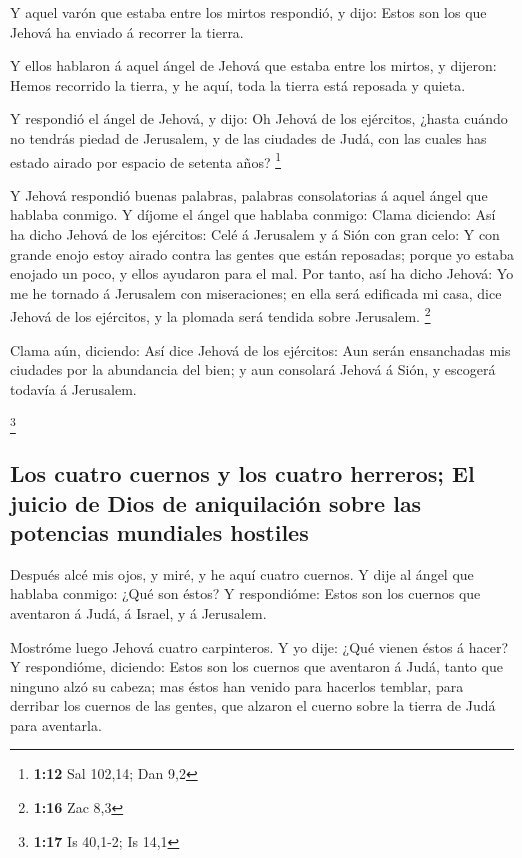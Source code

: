  Y aquel varón que estaba entre los mirtos respondió, y
dijo: Estos son los que Jehová ha enviado á recorrer la tierra.

 Y ellos hablaron á aquel ángel de Jehová que estaba
entre los mirtos, y dijeron: Hemos recorrido la tierra, y he aquí, toda
la tierra está reposada y quieta.

 Y respondió el ángel de Jehová, y dijo: Oh Jehová de los
ejércitos, ¿hasta cuándo no tendrás piedad de Jerusalem, y de las
ciudades de Judá, con las cuales has estado airado por espacio de
setenta años? \footnote{\textbf{1:12} Sal 102,14; Dan 9,2}

 Y Jehová respondió buenas palabras, palabras
consolatorias á aquel ángel que hablaba conmigo.  Y
díjome el ángel que hablaba conmigo: Clama diciendo: Así ha dicho Jehová
de los ejércitos: Celé á Jerusalem y á Sión con gran celo:
 Y con grande enojo estoy airado contra las gentes que
están reposadas; porque yo estaba enojado un poco, y ellos ayudaron para
el mal.  Por tanto, así ha dicho Jehová: Yo me he tornado
á Jerusalem con miseraciones; en ella será edificada mi casa, dice
Jehová de los ejércitos, y la plomada será tendida sobre Jerusalem.
\footnote{\textbf{1:16} Zac 8,3}

 Clama aún, diciendo: Así dice Jehová de los ejércitos:
Aun serán ensanchadas mis ciudades por la abundancia del bien; y aun
consolará Jehová á Sión, y escogerá todavía á Jerusalem.

\footnote{\textbf{1:17} Is 40,1-2; Is 14,1}

\hypertarget{los-cuatro-cuernos-y-los-cuatro-herreros-el-juicio-de-dios-de-aniquilaciuxf3n-sobre-las-potencias-mundiales-hostiles}{%
\subsection{Los cuatro cuernos y los cuatro herreros; El juicio de Dios
de aniquilación sobre las potencias mundiales
hostiles}\label{los-cuatro-cuernos-y-los-cuatro-herreros-el-juicio-de-dios-de-aniquilaciuxf3n-sobre-las-potencias-mundiales-hostiles}}

 Después alcé mis ojos, y miré, y he aquí cuatro cuernos.
 Y dije al ángel que hablaba conmigo: ¿Qué son éstos? Y
respondióme: Estos son los cuernos que aventaron á Judá, á Israel, y á
Jerusalem.

 Mostróme luego Jehová cuatro carpinteros.
 Y yo dije: ¿Qué vienen éstos á hacer? Y respondióme,
diciendo: Estos son los cuernos que aventaron á Judá, tanto que ninguno
alzó su cabeza; mas éstos han venido para hacerlos temblar, para
derribar los cuernos de las gentes, que alzaron el cuerno sobre la
tierra de Judá para aventarla.

